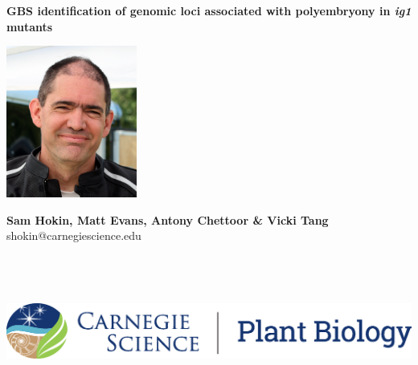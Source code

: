 \documentclass[maize,portrait]{a0poster}
\begin{document}


\textbf{\color{CarnegiePriBlue} \Huge GBS identification of genomic loci associated with polyembryony in \textit{ig1} mutants}    %

\begin{minipage}[m]{0.06\linewidth}
  \includegraphics[height=50mm]{sam-bfr-smiling-crop.jpg} %
  \hfill
\end{minipage}
\begin{minipage}[m]{0.40\linewidth}                      %
  \color{Black}
  \Large \textbf{Sam Hokin, Matt Evans, Antony Chettoor \& Vicki Tang}
  \large shokin@carnegiescience.edu
\end{minipage}
\hfill
\begin{minipage}[m]{0.50\linewidth}                      %
  \hfill
  \includegraphics[height=50mm]{CS_plantbio_logo_horz.eps} %
\end{minipage}
\end{document}
